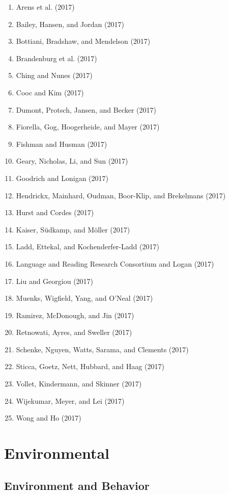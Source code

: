 \documentclass[english,man]{apa6}
\providecommand{\tightlist}{%
  \setlength{\itemsep}{0pt}\setlength{\parskip}{0pt}}
\begin{document}
\begin{enumerate}
\def\labelenumi{\arabic{enumi})}
\tightlist
\item
  Arens et al. (2017)
\item
  Bailey, Hansen, and Jordan (2017)
\item
  Bottiani, Bradshaw, and Mendelson (2017)
\item
  Brandenburg et al. (2017)
\item
  Ching and Nunes (2017)
\item
  Cooc and Kim (2017)
\item
  Dumont, Protsch, Jansen, and Becker (2017)
\item
  Fiorella, Gog, Hoogerheide, and Mayer (2017)
\item
  Fishman and Husman (2017)
\item
  Geary, Nicholas, Li, and Sun (2017)
\item
  Goodrich and Lonigan (2017)
\item
  Hendrickx, Mainhard, Oudman, Boor-Klip, and Brekelmans (2017)
\item
  Hurst and Cordes (2017)
\item
  Kaiser, Südkamp, and Möller (2017)
\item
  Ladd, Ettekal, and Kochenderfer-Ladd (2017)
\item
  Language and Reading Research Consortium and Logan (2017)
\item
  Liu and Georgiou (2017)
\item
  Muenks, Wigfield, Yang, and O'Neal (2017)
\item
  Ramirez, McDonough, and Jin (2017)
\item
  Retnowati, Ayres, and Sweller (2017)
\item
  Schenke, Nguyen, Watts, Sarama, and Clements (2017)
\item
  Sticca, Goetz, Nett, Hubbard, and Haag (2017)
\item
  Vollet, Kindermann, and Skinner (2017)
\item
  Wijekumar, Meyer, and Lei (2017)
\item
  Wong and Ho (2017)
\end{enumerate}

\section{Environmental}\label{environmental}

\subsection{Environment and Behavior}\label{environment-and-behavior}
\end{document}
